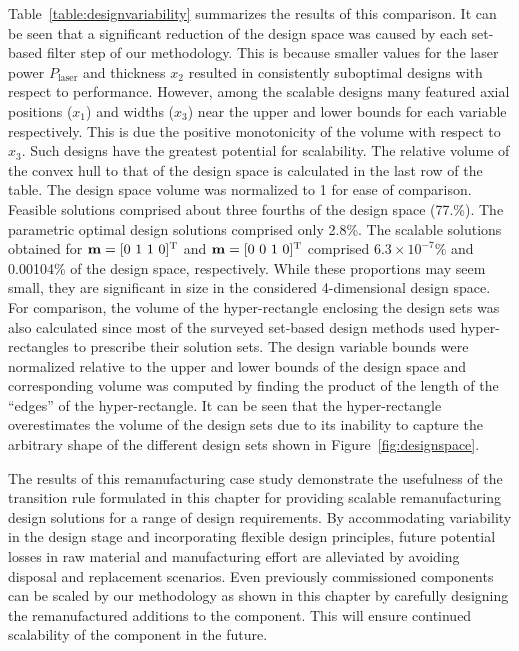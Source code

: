 Table~\ref{table:designvariability} summarizes the results of this comparison. It can be seen that a significant reduction of the design space was caused by each set-based filter step of our methodology. This is because smaller values for the laser power $P_{\textrm{laser}}$ and thickness $x_2$ resulted in consistently suboptimal designs with respect to performance. However, among the scalable designs many featured axial positions ($x_1$) and widths ($x_3$) near the upper and lower bounds for each variable respectively. This is due the positive monotonicity of the volume with respect to $x_3$. Such designs have the greatest potential for scalability. The relative volume of the convex hull to that of the design space is calculated in the last row of the table. The design space volume was normalized to 1 for ease of comparison. Feasible solutions comprised about three fourths of the design space (77.\%). The parametric optimal design solutions comprised only 2.8\%. The scalable solutions obtained for $\mathbf{m} = [0~1~1~0]^{\text T}$ and $\mathbf{m} = [0~0~1~0]^{\text T}$ comprised $6.3\times10^{-7}\%$ and 0.00104\% of the design space, respectively. While these proportions may seem small, they are significant in size in the considered 4-dimensional design space. For comparison, the volume of the hyper-rectangle enclosing the design sets was also calculated since most of the surveyed set-based design methods used hyper-rectangles to prescribe their solution sets. The design variable bounds were normalized relative to the upper and lower bounds of the design space and corresponding volume was computed by finding the product of the length of the ``edges'' of the hyper-rectangle. It can be seen that the hyper-rectangle overestimates the volume of the design sets due to its inability to capture the arbitrary shape of the different design sets shown in Figure~\ref{fig:designspace}. 

The results of this remanufacturing case study  demonstrate the usefulness of the transition rule formulated in this chapter for providing scalable remanufacturing design solutions for a range of design requirements. By accommodating variability in the design stage and incorporating flexible design principles, future potential losses in raw material and manufacturing effort are alleviated by avoiding disposal and replacement scenarios. Even previously commissioned components can be scaled by our methodology as shown in this chapter by carefully designing the remanufactured additions to the component. This will ensure continued scalability of the component in the future.

